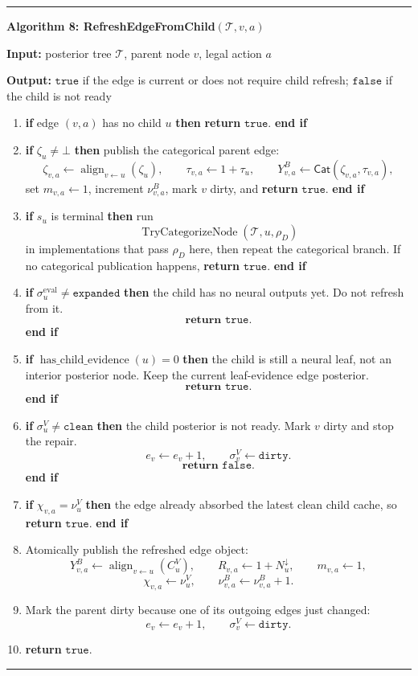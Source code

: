 \documentclass[11pt]{article}
\newcommand{\Tree}{\mathcal{T}}
\newcommand{\Align}{\operatorname{align}}
\newcommand{\CatObj}{\mathsf{Cat}}
\newcommand{\TryCategorizeNode}{\operatorname{TryCategorizeNode}}
\newenvironment{algorithmblock}[1]
{
  \par\medskip
  \noindent\hrule\par\smallskip
  \noindent\textbf{#1}
  \par\smallskip
}
{
  \par\smallskip\noindent\hrule\par\medskip
}
\newcommand{\Input}{\textbf{Input: }}
\newcommand{\Output}{\textbf{Output: }}
\newcommand{\Return}{\textbf{return }}
\newcommand{\If}{\textbf{if }}
\newcommand{\Then}{\textbf{ then }}
\newcommand{\EndIf}{\textbf{end if}}
\begin{document}
\begin{algorithmblock}{Algorithm 8: RefreshEdgeFromChild\((\Tree,v,a)\)}

\Input posterior tree \(\Tree\), parent node \(v\), legal action \(a\)

\Output \(\texttt{true}\) if the edge is current or does not require child refresh; \(\texttt{false}\) if the child is not ready

\begin{enumerate}[leftmargin=2em]
  \item \If edge \((v,a)\) has no child \(u\) \Then \Return \(\texttt{true}\). \EndIf

  \item \If \(\zeta_u\ne\bot\) \Then publish the categorical parent edge:
  \[
  \zeta_{v,a}\gets\Align_{v\leftarrow u}(\zeta_u),
  \qquad
  \tau_{v,a}\gets1+\tau_u,
  \qquad
  Y^B_{v,a}\gets\CatObj(\zeta_{v,a},\tau_{v,a}),
  \]
  set \(m_{v,a}\gets1\), increment \(\nu^B_{v,a}\), mark \(v\) dirty, and
  \Return \(\texttt{true}\). \EndIf

  \item \If \(s_u\) is terminal \Then run
  \[
  \TryCategorizeNode(\Tree,u,\rho_D)
  \]
  in implementations that pass \(\rho_D\) here, then repeat the categorical
  branch. If no categorical publication happens, \Return \(\texttt{true}\).
  \EndIf

  \item \If \(\sigma^{\mathrm{eval}}_u\ne\texttt{expanded}\) \Then
  the child has no neural outputs yet. Do not refresh from it.
  \[
  \Return \texttt{true}.
  \]
  \EndIf

  \item \If \(\operatorname{has\_child\_evidence}(u)=0\) \Then
  the child is still a neural leaf, not an interior posterior node. Keep the
  current leaf-evidence edge posterior.
  \[
  \Return \texttt{true}.
  \]
  \EndIf

  \item \If \(\sigma^V_u\ne\texttt{clean}\) \Then
  the child posterior is not ready. Mark \(v\) dirty and stop the repair.
  \[
  e_v\gets e_v+1,
  \qquad
  \sigma^V_v\gets\texttt{dirty}.
  \]
  \[
  \Return \texttt{false}.
  \]
  \EndIf

  \item \If \(\chi_{v,a}=\nu^V_u\) \Then the edge already absorbed the latest
  clean child cache, so \Return \(\texttt{true}\). \EndIf

  \item Atomically publish the refreshed edge object:
  \[
  Y^B_{v,a}
  \gets
  \Align_{v\leftarrow u}(C^V_u),
  \qquad
  R_{v,a}\gets 1+N^\downarrow_u,
  \qquad
  m_{v,a}\gets 1,
  \]
  \[
  \chi_{v,a}\gets \nu^V_u,
  \qquad
  \nu^B_{v,a}\gets\nu^B_{v,a}+1.
  \]

  \item Mark the parent dirty because one of its outgoing edges just changed:
  \[
  e_v\gets e_v+1,
  \qquad
  \sigma^V_v\gets\texttt{dirty}.
  \]

  \item \Return \(\texttt{true}\).
\end{enumerate}

\end{algorithmblock}
\end{document}
